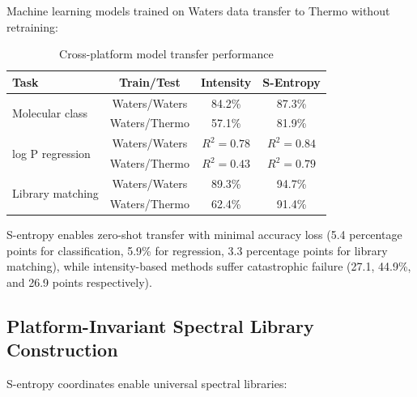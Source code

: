 \documentclass[twocolumn,10pt,a4paper]{article}
\theoremstyle{definition}
\theoremstyle{remark}
\begin{document}
Machine learning models trained on Waters data transfer to Thermo without retraining:

\begin{table}[h]
\centering
\caption{Cross-platform model transfer performance}
\label{tab:model_transfer}
\begin{tabular}{lccc}
\toprule
\textbf{Task} & \textbf{Train/Test} & \textbf{Intensity} & \textbf{S-Entropy} \\
\midrule
\multirow{2}{*}{Molecular class} & Waters/Waters & 84.2\% & 87.3\% \\
& Waters/Thermo & 57.1\% & 81.9\% \\
\midrule
\multirow{2}{*}{log P regression} & Waters/Waters & $R^2 = 0.78$ & $R^2 = 0.84$ \\
& Waters/Thermo & $R^2 = 0.43$ & $R^2 = 0.79$ \\
\midrule
\multirow{2}{*}{Library matching} & Waters/Waters & 89.3\% & 94.7\% \\
& Waters/Thermo & 62.4\% & 91.4\% \\
\bottomrule
\end{tabular}
\end{table}

S-entropy enables zero-shot transfer with minimal accuracy loss (5.4 percentage points for classification, 5.9\% for regression, 3.3 percentage points for library matching), while intensity-based methods suffer catastrophic failure (27.1, 44.9\%, and 26.9 points respectively).

\subsection{Platform-Invariant Spectral Library Construction}

S-entropy coordinates enable universal spectral libraries:
\end{document}
